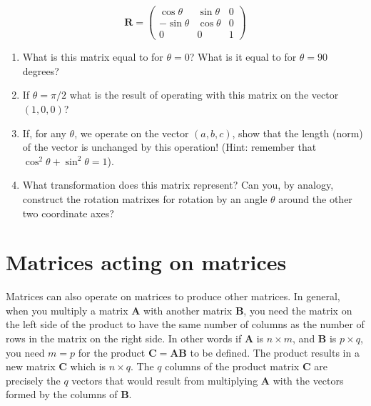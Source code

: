 \documentclass{tufte-handout}
\begin{document}
\begin{equation}
\mathbf{R} =  \left( \begin{array}{ccc}
   \cos \theta & \sin \theta & 0  \\
   -\sin\theta & \cos \theta & 0  \\
   0  & 0  &  1
 \end{array} \right)
\end{equation}
\begin{enumerate}[resume]
\item  What is this matrix equal to for $\theta = 0$?  What is it equal to for $\theta = 90$ degrees?
\item  If $\theta = \pi/2$ what is the result of operating with this matrix on the vector $(1,0,0)$?
\item  If, for any $\theta$, we operate on the vector $(a,b,c)$, show that the length (norm) of the vector is unchanged by this operation!   (Hint:  remember that $\cos^2\theta + \sin^2\theta = 1$).
\item  What transformation does this matrix represent?  Can you, by analogy, construct the rotation matrixes for rotation by an angle $\theta$ around the other two coordinate axes?
\end{enumerate}


\section{Matrices acting on matrices}

Matrices can also operate on matrices to produce other matrices. In general, when you multiply a matrix $\mathbf{A}$ with another matrix $\mathbf{B}$, you need the matrix on the left side of the product to have the same number of columns as the number of rows in the matrix on the right side. In other words if $\mathbf{A}$ is $n\times m$, and $\mathbf{B}$ is $p\times q$, you need $m = p$ for the product $\mathbf{C} = \mathbf{AB}$ to be defined. The product results in a new matrix $\mathbf{C}$ which is $n\times q$. The $q$ columns of the product matrix $\mathbf{C}$ are precisely the $q$ vectors that would result from multiplying $\mathbf{A}$ with the vectors formed by the columns of $\mathbf{B}$.
\end{document}
